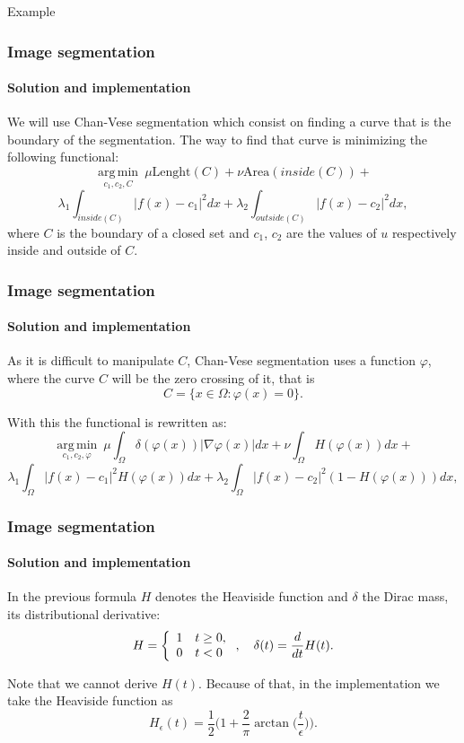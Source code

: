 \documentclass[11pt]{beamer}
\DeclareMathOperator*{\argmin}{\mathrm{arg\, min}}
\begin{document}
\begin{frame}
\begin{exampleblock}{Example}
\begin{figure}
\begin{subfigure}[b]{0.4\textwidth}
    \end{subfigure}

\end{figure}
\end{exampleblock}
\end{frame}

\begin{frame}
\frametitle{Image segmentation}
\framesubtitle{Solution and implementation}

We will use Chan-Vese segmentation which consist on finding a curve that is the boundary of the segmentation. The way to find that curve is minimizing the following functional:
$$\displaystyle\argmin\limits_{c_1, c_2, C}\ \mu \text{Lenght}(C) +\nu\text{Area}(inside(C)) +$$$$ \lambda_1\int_{inside(C)}|f(x)-c_1|^2dx + \lambda_2\int_{outside(C)}|f(x)-c_2|^2dx,$$
where $C$ is the boundary of a closed set and $c_1$, $c_2$ are the values of $u$ respectively inside and outside of $C$. 

\end{frame}

\begin{frame}
\frametitle{Image segmentation}
\framesubtitle{Solution and implementation}
\begin{block}{}
As it is difficult to manipulate $C$, Chan-Vese segmentation uses a function $\varphi$, where the curve $C$ will be the zero crossing of it, that is 
$$C = \{x\in \Omega:\varphi(x) = 0\}.$$
\end{block}

With this the functional is rewritten as:
$$\displaystyle\argmin\limits_{c_1, c_2, \varphi}\ \mu \int_{\Omega}\delta(\varphi(x))|\nabla\varphi(x)|dx+\nu \int_{\Omega}H(\varphi(x))dx +$$$$ \lambda_1\int_{\Omega}|f(x)-c_1|^2H(\varphi(x))dx + \lambda_2\int_{\Omega}|f(x) -c_2|^2(1-H(\varphi(x)))dx,$$
\end{frame}

\begin{frame}
\frametitle{Image segmentation}
\framesubtitle{Solution and implementation}
In the previous formula $H$ denotes the Heaviside function and $\delta$ the Dirac mass, its distributional derivative:
$$ H = \left\lbrace\begin{array}{l l}
1&t\geq 0,\\
0 & t<0
\end{array}\right. ,\quad \delta(t) = \frac{d}{dt}H(t).$$

Note that we cannot derive $H(t)$. Because of that, in the implementation we take the Heaviside function as
$$H_{\epsilon}(t) = \frac{1}{2}\bigg(1 + \frac{2}{\pi}\arctan \bigg(\frac{t}{\epsilon}\bigg)\bigg).$$

\end{frame}
\end{document}
